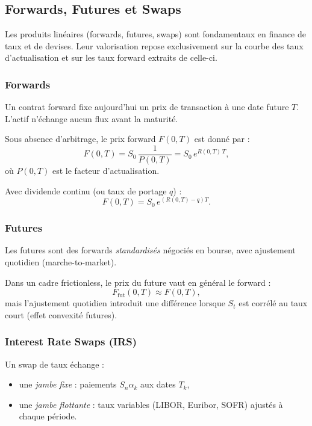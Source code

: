 \documentclass[11pt,a4paper]{article}
\newcommand{\1}{\mathbf{1}}
\begin{document}
\subsection{Forwards, Futures et Swaps}

Les produits linéaires (forwards, futures, swaps) sont fondamentaux en finance
de taux et de devises. Leur valorisation repose exclusivement sur la courbe des
taux d'actualisation et sur les taux forward extraits de celle-ci.

\subsubsection{Forwards}

Un contrat forward fixe aujourd'hui un prix de transaction à une date future $T$.
L'actif n'échange aucun flux avant la maturité.

Sous absence d'arbitrage, le prix forward $F(0,T)$ est donné par :
\[
F(0,T) = S_0 \,\frac{1}{P(0,T)}
       = S_0\, e^{R(0,T)\,T},
\]
où $P(0,T)$ est le facteur d'actualisation.

Avec dividende continu (ou taux de portage $q$) :
\[
F(0,T) = S_0\, e^{(R(0,T)-q)T}.
\]

\subsubsection{Futures}

Les futures sont des forwards \emph{standardisés} négociés en bourse, avec
ajustement quotidien (marche-to-market).

Dans un cadre frictionless, le prix du future vaut en général le forward :
\[
F_{\mathrm{fut}}(0,T) \approx F(0,T),
\]
mais l'ajustement quotidien introduit une différence lorsque $S_t$ est
corrélé au taux court (effet convexité futures).

\subsubsection{Interest Rate Swaps (IRS)}

Un swap de taux échange :
\begin{itemize}
  \item une \emph{jambe fixe} : paiements $S_n \alpha_k$ aux dates $T_k$,
  \item une \emph{jambe flottante} : taux variables (LIBOR, Euribor, SOFR) ajustés à chaque période.
\end{itemize}
\end{document}
